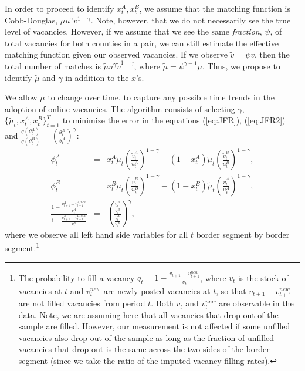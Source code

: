 \documentclass[12pt]{article}
\newcommand{\1}{\mathbf{1}}
\newcommand{\vatt}{\tilde{v}^A_t}
\newcommand{\vbtt}{\tilde{v}^B_t}
\newcommand{\xat}{x^A_t}
\newcommand{\xbt}{x^B_t}
\newcommand{\tat}{\theta^A_t}
\newcommand{\tbt}{\theta^B_t}
\newcommand{\uat}{u^A_t}
\newcommand{\ubt}{u^B_t}
\begin{document}
\begin{appendix}
In order to proceed to identify $\xat,\xbt$, we assume that the matching function is Cobb-Douglas, $\mu u^\gamma v^{1-\gamma}$.   Note, however, that we do not necessarily see the true level of vacancies.  However, if we assume that we see the same \textit{fraction}, $\psi$, of total vacancies for both counties in a pair, we can still estimate the effective matching function given our observed vacancies.  If we observe $\tilde{v}=\psi v$, then the total number of matches is $\tilde{\mu} u^\gamma \tilde{v}^{1-\gamma}$, where $\tilde{\mu}=\psi^{\gamma-1}\mu$.  Thus, we propose to identify $\tilde{\mu}$ and $\gamma$ in addition to the $x$'s.

We allow $\tilde{\mu}$ to change over time, to capture any possible time trends in the adoption of online vacancies.  The algorithm consists of selecting $\gamma$, $\{\tilde{\mu}_t,\xat,\xbt\}_{t=1}^T$ to minimize the error in the equations (\ref{eq:JFR}), (\ref{eq:JFR2}) and $\frac{q(\tat)}{q(\tbt)}=\left(\frac{\tbt}{\tat}\right)^{\gamma}$:
\begin{eqnarray}
\phi_t^A &=& \xat \tilde{\mu}_t\left(\frac{\vatt}{\uat}\right)^{1-\gamma}-\left(1-\xat\right)\tilde{\mu}_t\left(\frac{\vbtt}{\ubt}\right)^{1-\gamma} ,\\
\phi_t^B &=& \xbt \tilde{\mu}_t\left(\frac{\vbtt}{\ubt}\right)^{1-\gamma}-\left(1-\xbt\right) \tilde{\mu}_t\left(\frac{\vatt}{\uat}\right)^{1-\gamma},\\
\frac{1 - \frac{v^A_{t+1}-v^{A,new}_{t+1}}{v^A_t}}{1 - \frac{v^B_{t+1}-v^{B,new}_{t+1}}{v^B_t}}&=&\left(\frac{\frac{\vbtt}{\ubt}}{\frac{\vatt}{\uat}}\right)^{\gamma},
\end{eqnarray}
where we observe all left hand side variables for all $t$ border segment by border segment.\footnote{The probability to fill a vacancy $q_t = 1 - \frac{v_{t+1}-v^{new}_{t+1}}{v_t}$, where $v_t$ is the stock of vacancies at $t$ and $v^{new}_{t}$ are newly posted vacancies at $t$, so that $v_{t+1}-v^{new}_{t+1}$ are not filled vacancies from period $t$. Both $v_t$ and $v^{new}_t$ are observable in the data. Note, we are assuming here that all vacancies that drop out of the sample are filled. However, our measurement is not affected if some unfilled vacancies also drop out of the sample as long as the fraction of unfilled vacancies that drop out is the same across the two sides of the border segment (since we take the ratio of the imputed vacancy-filling rates).}



\end{appendix}
\end{document}
